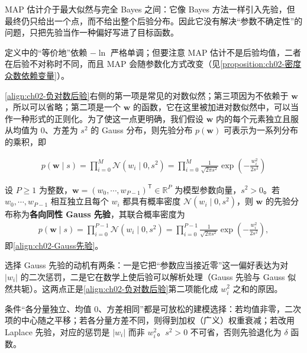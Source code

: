 \documentclass[../../main.tex]{subfiles}
\begin{document}
\begin{remark}
MAP 估计介于最大似然与完全 Bayes 之间：它像 Bayes 方法一样引入先验，但最终仍只给出一个点，而不给出整个后验分布。因此它没有解决“参数不确定性”的问题，只把先验当作一种偏好写进了目标函数。

定义中的“等价地”依赖 $-\ln$ 严格单调；但要注意 MAP 估计不是后验均值，二者在后验不对称时不同，而且 MAP 会随参数化方式改变（见\cref{proposition:ch02-密度众数依赖变量}）。
\end{remark}

\eqref{align:ch02-负对数后验}右侧的第一项是常见的对数似然；第三项因为不依赖于 $\mathbf{w}$，所以可以省略；第二项是一个 $\mathbf{w}$ 的函数，它在这里被加进对数似然中，可以当作一种形式的正则化。为了使这一点更明确，我们假设 $\mathbf{w}$ 内的每个元素独立且服从均值为 $0$、方差为 $s^{2}$ 的 Gauss 分布，则先验分布 $p(\mathbf{w})$ 可表示为一系列分布的乘积，即

\begin{align}
  p(\mathbf{w}\mid s) = \prod_{i=0}^{M}\mathcal{N}(w_i\mid0,s^{2}) = \prod_{i=0}^{M}\frac{1}{\sqrt{2\pi s^{2}}}\exp\left(-\frac{w_i^{2}}{2s^{2}}\right)
  \label{align:ch02-Gauss先验}
\end{align}

\begin{definition}\label{definition:ch02-Gauss先验}
设 $P\geqslant1$ 为整数，$\mathbf{w}=(w_0,\cdots,w_{P-1})^{\mathsf{T}}\in\mathbb{R}^{P}$ 为模型参数向量，$s^{2}>0$。若 $w_0,\cdots,w_{P-1}$ 相互独立且每个 $w_i$ 都具有概率密度 $\mathcal{N}(w_i\mid0,s^{2})$，则 $\mathbf{w}$ 的先验分布称为\textbf{各向同性 Gauss 先验}，其联合概率密度为
\begin{align*}
  p(\mathbf{w}\mid s)=\prod_{i=0}^{P-1}\mathcal{N}(w_i\mid0,s^{2})=\prod_{i=0}^{P-1}\frac{1}{\sqrt{2\pi s^{2}}}\exp\left(-\frac{w_i^{2}}{2s^{2}}\right),
\end{align*}
即\eqref{align:ch02-Gauss先验}。
\end{definition}

\begin{remark}
选择 Gauss 先验的动机有两条：一是它把“参数应当接近零”这一偏好表达为对 $|w_i|$ 的二次惩罚，二是它在数学上使后验可以解析处理（Gauss 先验与 Gauss 似然共轭）。这两点正是\eqref{align:ch02-负对数后验}第二项能化成 $w_i^{2}$ 之和的原因。

条件“各分量独立、均值 $0$、方差相同”都是可放松的建模选择：若均值非零，二次项的中心随之平移；若各分量方差不同，则得到加权（广义）权重衰减；若改用 Laplace 先验，对应的惩罚是 $|w_i|$ 而非 $w_i^{2}$。$s^{2}>0$ 不可省，否则先验退化为 $\delta$ 函数。
\end{remark}
\end{document}
